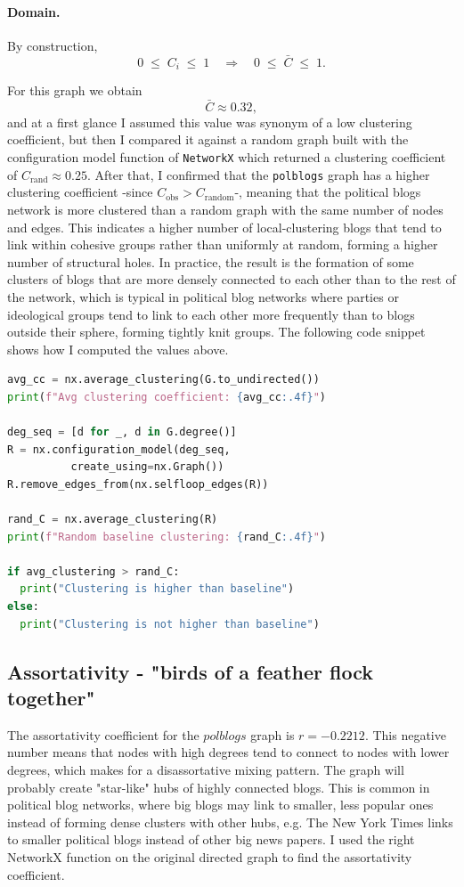 \documentclass{article}
\begin{document}
\paragraph{Domain.} 
By construction,
\[
0 \;\le\; C_i \;\le\;1
\quad\Longrightarrow\quad
0 \;\le\;\bar C\;\le\;1.
\]

For this graph we obtain
\[
\bar C \approx 0.32,
\]
and at a first glance I assumed this value was synonym of a low clustering coefficient, but then I compared it against a random graph built with the configuration model function of \texttt{NetworkX} which returned a clustering coefficient of \(C_{\mathrm{rand}} \approx 0.25\).
After that, I confirmed that the \texttt{polblogs} graph has a higher clustering coefficient -since \(C_{\mathrm{obs}} > C_{\mathrm{random}}\)-, meaning that the political blogs network is more clustered than a random graph with the same number of nodes and edges.
This indicates a higher number of local-clustering blogs that tend to link within cohesive groups rather than uniformly at random, forming a higher number of structural holes.
In practice, the result is the formation of some clusters of blogs that are more densely connected to each other than to the rest of the network, which is typical in political blog networks where parties or ideological groups tend to link to each other more frequently than to blogs outside their sphere, forming tightly knit groups.
The following code snippet shows how I computed the values above.

\begin{lstlisting}[language=Python]
avg_cc = nx.average_clustering(G.to_undirected())
print(f"Avg clustering coefficient: {avg_cc:.4f}")

deg_seq = [d for _, d in G.degree()]
R = nx.configuration_model(deg_seq, 
          create_using=nx.Graph())  
R.remove_edges_from(nx.selfloop_edges(R))

rand_C = nx.average_clustering(R)
print(f"Random baseline clustering: {rand_C:.4f}")

if avg_clustering > rand_C:
  print("Clustering is higher than baseline")
else:
  print("Clustering is not higher than baseline")
\end{lstlisting}

\subsection{Assortativity - "birds of a feather flock together"}
The assortativity coefficient for the $polblogs$ graph is \(r = -0.2212\). 
This negative number means that nodes with high degrees tend to connect to nodes with lower degrees, which makes for a disassortative mixing pattern. 
The graph will probably create "star-like" hubs of highly connected blogs. This is common in political blog networks, where big blogs may link to smaller, less popular ones instead of forming dense clusters with other hubs, e.g. The New York Times links to smaller political blogs instead of other big news papers.
I used the right NetworkX function on the original directed graph to find the assortativity coefficient.
\end{document}
